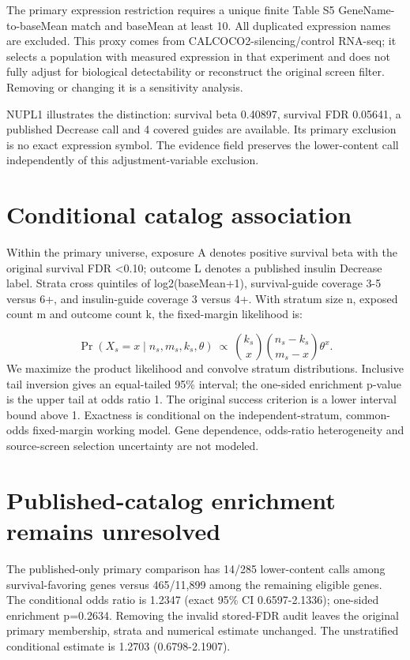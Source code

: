 \documentclass[10pt,letterpaper]{article}
\begin{document}
The primary expression restriction requires a unique finite Table S5 GeneName-to-baseMean match and baseMean at least 10. All duplicated expression names are excluded. This proxy comes from CALCOCO2-silencing/control RNA-seq; it selects a population with measured expression in that experiment and does not fully adjust for biological detectability or reconstruct the original screen filter. Removing or changing it is a sensitivity analysis.

NUPL1 illustrates the distinction: survival beta 0.40897, survival FDR 0.05641, a published Decrease call and 4 covered guides are available. Its primary exclusion is no exact expression symbol. The evidence field preserves the lower-content call independently of this adjustment-variable exclusion.

\section*{Conditional catalog association}
Within the primary universe, exposure A denotes positive survival beta with the original survival FDR <0.10; outcome L denotes a published insulin Decrease label. Strata cross quintiles of log2(baseMean+1), survival-guide coverage 3-5 versus 6+, and insulin-guide coverage 3 versus 4+. With stratum size n, exposed count m and outcome count k, the fixed-margin likelihood is:

\[\Pr(X_s=x\mid n_s,m_s,k_s,\theta)\ \propto\ {k_s\choose x}{n_s-k_s\choose m_s-x}\theta^x.\]
We maximize the product likelihood and convolve stratum distributions. Inclusive tail inversion gives an equal-tailed 95\% interval; the one-sided enrichment p-value is the upper tail at odds ratio 1. The original success criterion is a lower interval bound above 1. Exactness is conditional on the independent-stratum, common-odds fixed-margin working model. Gene dependence, odds-ratio heterogeneity and source-screen selection uncertainty are not modeled.

\clearpage
\section*{Published-catalog enrichment remains unresolved}
The published-only primary comparison has 14/285 lower-content calls among survival-favoring genes versus 465/11,899 among the remaining eligible genes. The conditional odds ratio is 1.2347 (exact 95\% CI 0.6597-2.1336); one-sided enrichment p=0.2634. Removing the invalid stored-FDR audit leaves the original primary membership, strata and numerical estimate unchanged. The unstratified conditional estimate is 1.2703 (0.6798-2.1907).
\end{document}
